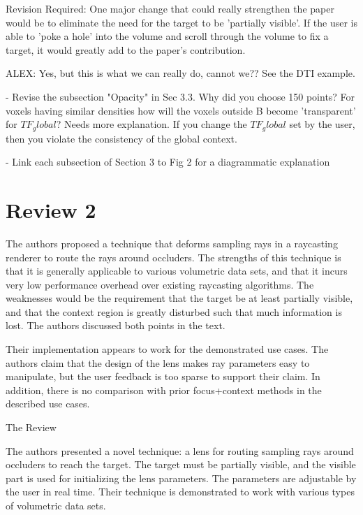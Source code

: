 \documentclass[a4paper,10pt]{article}
\begin{document}
    Revision Required:
    One major change that could really strengthen the paper would be to eliminate the
    need for the target to be 'partially visible'. If the user is able to 'poke a
    hole' into the volume and scroll through the volume to fix a target, it would
    greatly add to the paper's contribution.
    
    ALEX: Yes, but this is what we can really do, cannot we?? See the DTI example.

    - Revise the subsection "Opacity" in Sec 3.3. Why did you choose 150 points? For
    voxels having similar densities how will the voxels outside B become 'transparent'
    for $TF_global$? Needs more explanation. If you change the $TF_global$ set by the
    user, then you violate the consistency of the global context.

    - Link each subsection of Section 3 to Fig 2 for a diagrammatic explanation

\section{Review 2}

The authors proposed a technique that deforms sampling rays in a raycasting
    renderer to route the rays around occluders. The strengths of this technique is
    that it is generally applicable to various volumetric data sets, and that it
    incurs very low performance overhead over existing raycasting algorithms. The
    weaknesses would be the requirement that the target be at least partially visible,
    and that the context region is greatly disturbed such that much information is
    lost. The authors discussed both points in the text.

    Their implementation appears to work for the demonstrated use cases. The authors
    claim that the design of the lens makes ray parameters easy to manipulate, but the
    user feedback is too sparse to support their claim. In addition, there is no
    comparison with prior focus+context methods in the described use cases.

  The Review

    The authors presented a novel technique: a lens for routing sampling rays around
    occluders to reach the target. The target must be partially visible, and the
    visible part is used for initializing the lens parameters. The parameters are
    adjustable by the user in real time. Their technique is demonstrated to work with
    various types of volumetric data sets.
\end{document}
